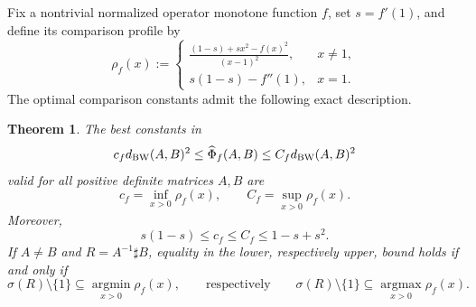 \documentclass[11pt]{amsart}
\newtheorem{theorem}{Theorem}[section]
\theoremstyle{definition}
\theoremstyle{remark}
\newcommand{\altPhi}{\widehat{\Phi}}
\begin{document}
	
Fix a nontrivial normalized operator monotone function $f$, set
$s=f'(1)$, and define its comparison profile by
\begin{equation}\label{eq:rho-f}
	\rho_f(x):=
	\begin{cases}
		\displaystyle
		\frac{(1-s)+sx^2-f(x)^2}{(x-1)^2},
		& x\ne1,\\[2mm]
		s(1-s)-f''(1),
		& x=1.
	\end{cases}
\end{equation}
The optimal comparison constants admit the following exact description.

\begin{theorem}
	\label{thm:individual-constants}
	The best constants in
	\begin{equation}\label{eq:individual-comparison}
		c_f d_{\rm BW}(A,B)^2
		\le \altPhi_f(A,B)
		\le C_f d_{\rm BW}(A,B)^2
	\end{equation}
	valid for all positive definite matrices $A,B$ are
	\[
	c_f=\inf_{x>0}\rho_f(x),
	\qquad
	C_f=\sup_{x>0}\rho_f(x).
	\]
	Moreover,
	\[
	s(1-s)\le c_f\le C_f\le1-s+s^2.
	\]
	If $A\ne B$ and $R=A^{-1}\sharp B$, equality in the lower,
	respectively upper, bound holds if and only if
	\[
	\sigma(R)\setminus\{1\}
	\subseteq\operatorname*{argmin}_{x>0}\rho_f(x),
	\qquad\text{respectively}\qquad
	\sigma(R)\setminus\{1\}
	\subseteq\operatorname*{argmax}_{x>0}\rho_f(x).
	\]
\end{theorem}
	
\end{document}
